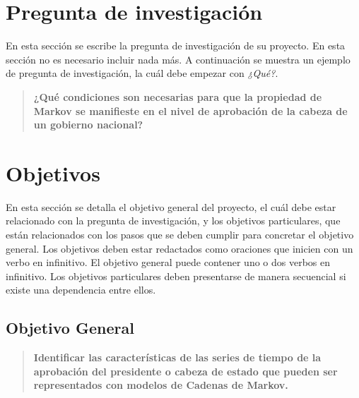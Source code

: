 \documentclass{ceri/sty/rapport}
\begin{document}

\section{Pregunta de investigación}
\label{sec:pregunta}
En esta sección se escribe la pregunta de investigación de su proyecto. En esta sección no es necesario incluir nada más. A continuación se muestra un ejemplo de pregunta de investigación, la cuál debe empezar con \emph{¿Qué?}.

\begin{quote}
    \textbf{¿Qué condiciones son necesarias para que la propiedad de Markov se manifieste en el nivel de aprobación de la cabeza de un gobierno nacional?}
\end{quote}

\section{Objetivos}
\label{sec:Generalites}
En esta sección se detalla el objetivo general del proyecto, el cuál debe estar relacionado con la pregunta de investigación, y los objetivos particulares, que están relacionados con los pasos que se deben cumplir para concretar el objetivo general. Los objetivos deben estar redactados como oraciones que inicien con un verbo en infinitivo. El objetivo general puede contener uno o dos verbos en infinitivo. Los objetivos particulares deben presentarse de manera secuencial si existe una dependencia entre ellos.
\subsection{Objetivo General}
\begin{quote}
    \textbf{Identificar las características de las series de tiempo de la aprobación del presidente o cabeza de estado que pueden ser representados con modelos de Cadenas de Markov.}
\end{quote}
\end{document}
